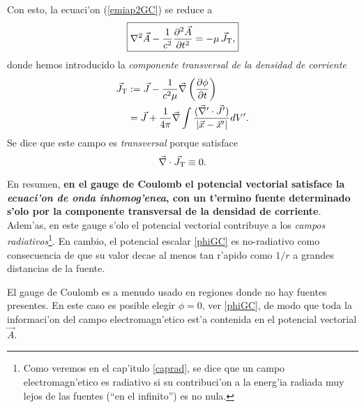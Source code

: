 Con esto, la ecuaci'on (\ref{emiap2GC}) se reduce a
\begin{equation}\label{emiap3GC}
\boxed{\nabla^2\vec{A}-\frac{1}{c^2}\frac{\partial^2\vec{A}}{\partial t^2}=-\mu\,\vec{J}_{\rm T},}
\end{equation}
donde hemos introducido la \textit{componente transversal de la densidad de corriente}
\begin{align}
\vec{J}_{\rm T} &:= \vec{J}-\frac{1}{c^2\mu}\vec{\nabla}\left(\frac{\partial\phi }{\partial t}\right) \\
&= \vec{J}+\frac{1}{4\pi} \vec{\nabla}\int\frac{(\vec{\nabla}'\cdot\vec{J}')}{\left|\vec{x}-\vec{x}'\right|}dV'.
\end{align}
Se dice que este campo es \textit{transversal} porque satisface
\begin{equation}
\vec\nabla\cdot\vec{J}_{\rm T}\equiv 0.
\end{equation}

En resumen, \textbf{en el gauge de Coulomb el potencial vectorial satisface la  \textit{ecuaci'on de onda inhomog'enea}, con un t'ermino fuente determinado s'olo por la componente transversal de la densidad de corriente}. Adem'as, en este gauge  s'olo el potencial vectorial contribuye a los \textit{campos radiativos}\footnote{Como veremos en el cap'itulo \ref{caprad}, se dice que un campo electromagn'etico es radiativo si su contribuci'on a la energ'ia radiada muy lejos de las fuentes (``en el infinito'') es no nula.}. En cambio, el potencial escalar \eqref{phiGC} es no-radiativo como consecuencia de que su valor decae al menos tan r'apido como $1/r$ a grandes distancias de la fuente.

El gauge de Coulomb es a menudo usado en regiones donde no hay fuentes presentes. En este caso es posible elegir $\phi=0$, ver \eqref{phiGC}, de modo que toda la informaci'on del campo electromagn'etico est'a contenida en el potencial vectorial $\vec{A}$.


